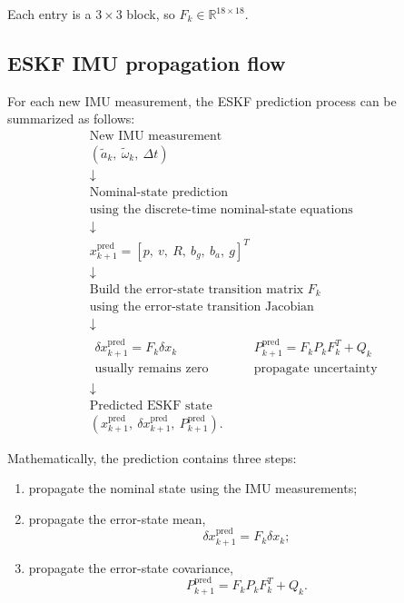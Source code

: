 \documentclass[11pt]{article}
\numberwithin{equation}{section}
\newcommand{\R}{\mathbb{R}}
\begin{document}
Each entry is a $3\times3$ block, so $F_k\in\R^{18\times18}$.

\subsection{ESKF IMU propagation flow}

For each new IMU measurement, the ESKF prediction process can be
summarized as follows:
\begin{equation}
\boxed{
\begin{array}{c}
\text{New IMU measurement}
\\
(\tilde a_k,\ \tilde\omega_k,\ \Delta t)
\\[2mm]
\downarrow
\\[2mm]
\text{Nominal-state prediction}
\\
\text{using the discrete-time nominal-state equations}
\\[2mm]
\downarrow
\\[2mm]
x_{k+1}^{\mathrm{pred}}
=
[p,\ v,\ R,\ b_g,\ b_a,\ g]^T
\\[2mm]
\downarrow
\\[2mm]
\text{Build the error-state transition matrix }F_k
\\
\text{using the error-state transition Jacobian}
\\[2mm]
\downarrow
\\[-1mm]
\begin{array}{ccc}
\delta x_{k+1}^{\mathrm{pred}}
=
F_k\delta x_k
&
\qquad
&
P_{k+1}^{\mathrm{pred}}
=
F_kP_kF_k^T+Q_k
\\
\text{usually remains zero}
&&
\text{propagate uncertainty}
\end{array}
\\[3mm]
\downarrow
\\[2mm]
\text{Predicted ESKF state}
\\
\left(
x_{k+1}^{\mathrm{pred}},
\ \delta x_{k+1}^{\mathrm{pred}},
\ P_{k+1}^{\mathrm{pred}}
\right).
\end{array}
}
\end{equation}

Mathematically, the prediction contains three steps:
\begin{enumerate}
    \item propagate the nominal state using the IMU measurements;
    \item propagate the error-state mean,
    \[
    \delta x_{k+1}^{\mathrm{pred}}=F_k\delta x_k;
    \]
    \item propagate the error-state covariance,
    \[
    P_{k+1}^{\mathrm{pred}}
    =
    F_kP_kF_k^T+Q_k.
    \]
\end{enumerate}
\end{document}
